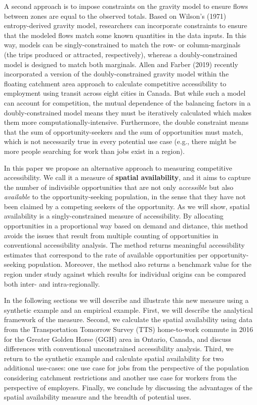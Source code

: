 \documentclass[]{elsarticle} %
\begin{document}
A second approach is to impose constraints on the gravity model to
ensure flows between zones are equal to the observed totals. Based on
Wilson's (1971) entropy-derived gravity model, researchers can
incorporate constraints to ensure that the modeled flows match some
known quantities in the data inputs. In this way, models can be
singly-constrained to match the row- or column-marginals (the trips
produced or attracted, respectively), whereas a doubly-constrained model
is designed to match both marginals. Allen and Farber (2019) recently
incorporated a version of the doubly-constrained gravity model within
the floating catchment area approach to calculate competitive
accessibility to employment using transit across eight cities in Canada.
But while such a model can account for competition, the mutual
dependence of the balancing factors in a doubly-constrained model means
they must be iteratively calculated which makes them more
computationally-intensive. Furthermore, the double constraint means that
the sum of opportunity-seekers and the sum of opportunities must match,
which is not necessarily true in every potential use case (e.g., there
might be more people searching for work than jobs exist in a region).

In this paper we propose an alternative approach to measuring
competitive accessibility. We call it a measure of \textbf{spatial
availability}, and it aims to capture the number of indivisible
opportunities that are not only \emph{accessible} but also
\emph{available} to the opportunity-seeking population, in the sense
that they have not been claimed by a competing seekers of the
opportunity. As we will show, spatial availability is a
singly-constrained measure of accessibility. By allocating opportunities
in a proportional way based on demand and distance, this method avoids
the issues that result from multiple counting of opportunities in
conventional accessibility analysis. The method returns meaningful
accessibility estimates that correspond to the rate of available
opportunities per opportunity-seeking population. Moreover, the method
also returns a benchmark value for the region under study against which
results for individual origins can be compared both inter- and
intra-regionally.

In the following sections we will describe and illustrate this new
measure using a synthetic example and an empirical example. First, we
will describe the analytical framework of the measure. Second, we
calculate the spatial availability using data from the Transportation
Tomorrow Survey (TTS) home-to-work commute in 2016 for the Greater
Golden Horse (GGH) area in Ontario, Canada, and discuss differences with
conventional unconstrained accessibility analysis. Third, we return to
the synthetic example and calculate spatial availability for two
additional use-cases: one use case for jobs from the perspective of the
population considering catchment restrictions and another use case for
workers from the perspective of employers. Finally, we conclude by
discussing the advantages of the spatial availability measure and the
breadth of potential uses.
\end{document}
